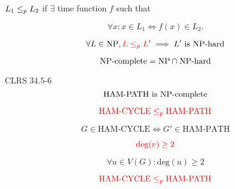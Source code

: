 
\begin{frame}
  \begin{definition}
	\begin{center}
	  $L_1 \le_{p} L_2$ if $\exists$  time function $f$ such that
	\end{center}
	\[
	  \forall x: x \in L_1 \iff f(x) \in L_2.
	\]
  \end{definition}

  \pause
  \vspace{0.30cm}
  \[
	\forall L \in \text{NP}, \textcolor{red}{L \le_{p} L'} \implies L' \text{ is } \text{NP-hard}
  \]

  \[
	\text{NP-complete} = \text{NP} \cap \text{NP-hard}
  \]
\end{frame}

\begin{frame}
  \begin{exampleblock}{CLRS $34.5$-$6$}
	\[
	  \text{HAM-PATH is } \text{NP-complete}
	\]
  \end{exampleblock}

  \pause
  \[
	\textcolor{red}{\text{HAM-CYCLE} \le_{p} \text{HAM-PATH}}
  \]

  \pause
  \begin{center}
	\resizebox{0.50\textwidth}{!}{}
  \end{center}

  \pause
  \vspace{-0.30cm}
  \[
	G \in \text{HAM-CYCLE} \iff G' \in \text{HAM-PATH}
  \]
\end{frame}

\begin{frame}

  \pause
  \[
	\textcolor{red}{\text{deg}(v) \ge 2}
  \]

  \pause
  \[
	\forall u \in V(G): \text{deg}(u) \ge 2
  \]
\end{frame}

\begin{frame}
  \[
	\textcolor{red}{\text{HAM-CYCLE} \le_{p} \text{HAM-PATH}}
  \]



\end{frame}

